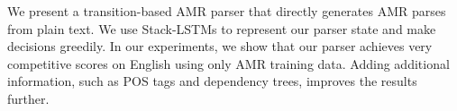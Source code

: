 We present a transition-based AMR parser that directly generates AMR parses from plain text. We use Stack-LSTMs to represent our parser state and make decisions greedily. In our experiments, we show that our parser achieves very competitive scores on English using only AMR training data. Adding additional information, such as POS tags and dependency trees, improves the results further.

